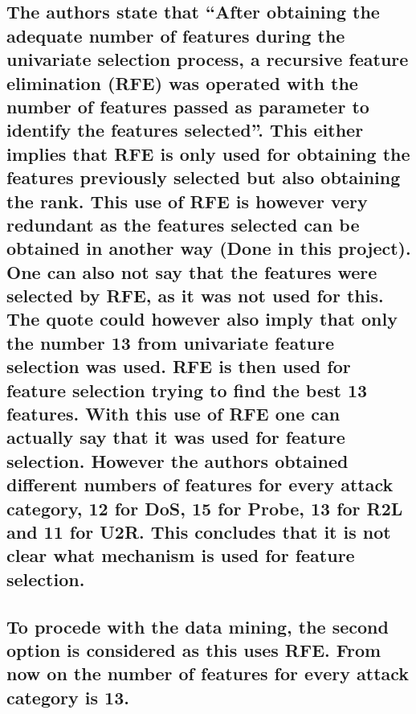 \documentclass[11pt]{article}
\begin{document}
{\subsection{The authors state that ``After obtaining the adequate number
of features during the univariate selection process, a recursive feature
elimination (RFE) was operated with the number of features passed as
parameter to identify the features selected''. This either implies that
RFE is only used for obtaining the features previously selected but also
obtaining the rank. This use of RFE is however very redundant as the
features selected can be obtained in another way (Done in this project).
One can also not say that the features were selected by RFE, as it was
not used for this. The quote could however also imply that only the
number 13 from univariate feature selection was used. RFE is then used
for feature selection trying to find the best 13 features. With this use
of RFE one can actually say that it was used for feature selection.
However the authors obtained different numbers of features for every
attack category, 12 for DoS, 15 for Probe, 13 for R2L and 11 for U2R.
This concludes that it is not clear what mechanism is used for feature
selection.}\label{the-authors-state-that-after-obtaining-the-adequate-number-of-features-during-the-univariate-selection-process-a-recursive-feature-elimination-rfe-was-operated-with-the-number-of-features-passed-as-parameter-to-identify-the-features-selected.-this-either-implies-that-rfe-is-only-used-for-obtaining-the-features-previously-selected-but-also-obtaining-the-rank.-this-use-of-rfe-is-however-very-redundant-as-the-features-selected-can-be-obtained-in-another-way-done-in-this-project.-one-can-also-not-say-that-the-features-were-selected-by-rfe-as-it-was-not-used-for-this.-the-quote-could-however-also-imply-that-only-the-number-13-from-univariate-feature-selection-was-used.-rfe-is-then-used-for-feature-selection-trying-to-find-the-best-13-features.-with-this-use-of-rfe-one-can-actually-say-that-it-was-used-for-feature-selection.-however-the-authors-obtained-different-numbers-of-features-for-every-attack-category-12-for-dos-15-for-probe-13-for-r2l-and-11-for-u2r.-this-concludes-that-it-is-not-clear-what-mechanism-is-used-for-feature-selection.}}

\hypertarget{to-procede-with-the-data-mining-the-second-option-is-considered-as-this-uses-rfe.-from-now-on-the-number-of-features-for-every-attack-category-is-13.}{%
\subsection{To procede with the data mining, the second option is
considered as this uses RFE. From now on the number of features for
every attack category is
13.}\label{to-procede-with-the-data-mining-the-second-option-is-considered-as-this-uses-rfe.-from-now-on-the-number-of-features-for-every-attack-category-is-13.}}
\end{document}
